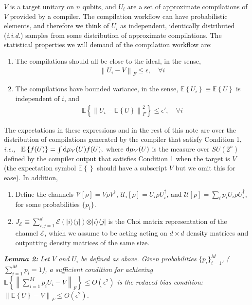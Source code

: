 \documentclass[fleqn,10pt]{wlscirep}
\newcommand{\ie}{\emph{i.e.,~}}
\newcommand{\ket}[1]{\vert#1\rangle}
\newcommand{\bra}[1]{\langle #1\vert}
\newcommand{\dg}{^\dagger}
\newcommand{\normf}[1]{\left\lVert #1 \right\rVert_F}
\newcommand{\E}[1]{\mathbb{E}\left\{ #1 \right\}}
\begin{document}
$V$ is a target unitary on $n$ qubits, and $U_i$ are a set of approximate compilations of $V$ provided by a compiler. The compilation workflow can have probabilistic elements, and therefore we think of $U_i$ as independent, identically distributed (\emph{i.i.d.}) samples from some distribution of approximate compilations. The statistical properties we will demand of the compilation workflow are:
\begin{enumerate}
\item The compilations should all be close to the ideal, in the sense,
    \begin{align}
	\normf{U_i-V} \leq \epsilon, \quad \forall i		
		\label{eq:ass1}
	\end{align}
	\item The compilations have bounded variance, in the sense, $\E{U_i} \equiv \E{U}$ is independent of $i$, and
	\begin{align}
		\E{\normf{U_i - \E{U}}^2} \leq \epsilon', \quad \forall i
		\label{eq:ass2}
	\end{align}
\end{enumerate}
The expectations in these expressions and in the rest of this note are over the distribution of compilations generated by the compiler that satisfy Condition 1, \ie
$ \E{f(U)} = \int {\rm d}\mu_V(U) f(U), $
where ${\rm d}\mu_V(U)$ is the measure over $SU(2^n)$ defined by the compiler output that satisfies Condition 1 when the target is $V$ (the expectation symbol $\E{}$ should have a subscript $V$ but we omit this for ease). In addition,
\begin{enumerate}
    \item Define the channels $\mathcal{V}[\rho] = V \rho V\dg$, $\mathcal{U}_i[\rho] = U_i \rho U_i\dg$, and $\mathcal{U}[\rho] = \sum_i p_i U_i \rho U_i\dg$, for some probabilities $\{p_i\}$.
    \item $J_{\mathcal{E}} \equiv \sum_{i,j=1}^d \mathcal{E}(\ket{i}\bra{j})\otimes \ket{i}\bra{j}$ is the Choi matrix representation of the channel $\mathcal{E}$, which we assume to be acting acting on $d\times d$ density matrices and outputting density matrices of the same size.
\end{enumerate}

\noindent \emph{\bf Lemma 2:} \emph{Let $V$ and $U_i$ be defined as above. Given probabilities $\{p_i\}_{i=1}^M$, ($\sum_{i=1}^M p_i=1$), a sufficient condition for achieving $\E{\normf{\sum_{i=1}^M p_i U_i - V}} \leq O(\epsilon^2)$ is the \emph{reduced bias condition}: $\normf{\E{U}-V} \leq O(\epsilon^2)$.}
\end{document}
